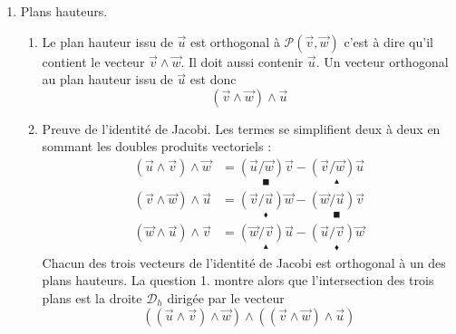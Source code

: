 \begin{enumerate}
\item Plans \og hauteurs\fg.
\begin{enumerate}
 \item Le plan hauteur issu de $\overrightarrow u$ est orthogonal à $\mathcal P (\overrightarrow v , \overrightarrow w)$ c'est à dire qu'il contient le vecteur $\overrightarrow v \wedge \overrightarrow w$. Il doit aussi contenir $\overrightarrow u$. Un vecteur orthogonal au plan hauteur issu de $\overrightarrow u$ est donc 
\begin{displaymath}
 (\overrightarrow v \wedge \overrightarrow w)\wedge \overrightarrow u
\end{displaymath}
 \item Preuve de l'identité de Jacobi.\newline
Les termes se simplifient deux à deux en sommant les doubles produits vectoriels :
\begin{align*}
 (\overrightarrow u \wedge \overrightarrow v)\wedge \overrightarrow w &=
\underset{\blacksquare}{(\overrightarrow u / \overrightarrow w)\overrightarrow v}
-\underset{\blacktriangle}{(\overrightarrow v / \overrightarrow w)\overrightarrow u} \\
 (\overrightarrow v \wedge \overrightarrow w)\wedge \overrightarrow u &=
\underset{\blacklozenge}{(\overrightarrow v / \overrightarrow u)\overrightarrow w}
-\underset{\blacksquare}{(\overrightarrow w / \overrightarrow u)\overrightarrow v} \\
 (\overrightarrow w \wedge \overrightarrow u)\wedge \overrightarrow v &=
\underset{\blacktriangle}{(\overrightarrow w / \overrightarrow v)\overrightarrow u}
-\underset{\blacklozenge}{(\overrightarrow u / \overrightarrow v)\overrightarrow w}
\end{align*}
Chacun des trois vecteurs de l'identité de Jacobi est orthogonal à un des plans hauteurs. La question 1. montre alors que l'intersection des trois plans est la droite $\mathcal D _h$ dirigée par le vecteur
\begin{displaymath}
 \left( (\overrightarrow u \wedge \overrightarrow v)\wedge \overrightarrow w\right) \wedge
\left( (\overrightarrow v \wedge \overrightarrow w)\wedge \overrightarrow u\right) 
\end{displaymath}
\end{enumerate}


\end{enumerate}
